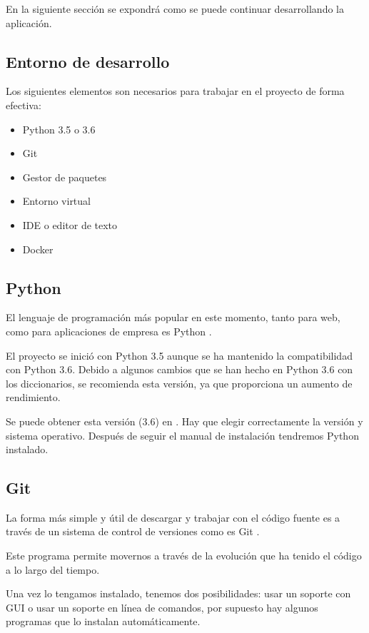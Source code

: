En la siguiente sección se expondrá como se puede continuar desarrollando la aplicación.

\subsection{Entorno de desarrollo}

Los siguientes elementos son necesarios para trabajar en el proyecto de forma efectiva:

\begin{itemize}
\setlength{\itemsep}{1pt}
\setlength{\parskip}{0pt}
\setlength{\parsep}{0pt}
\item Python 3.5 o 3.6
\item Git
\item Gestor de paquetes
\item Entorno virtual
\item IDE o editor de texto
\item Docker
\end{itemize}

\subsection{Python}

El lenguaje de programación más popular en este momento, tanto para web, como para aplicaciones de empresa es Python \cite{ppl}.

El proyecto se inició con Python 3.5 aunque se ha mantenido la compatibilidad con Python 3.6. Debido a algunos cambios que se han hecho en Python 3.6 con los diccionarios, se recomienda esta versión, ya que proporciona un aumento de rendimiento.

Se puede obtener esta versión (3.6) en \cite{py}. Hay que elegir correctamente la versión y sistema operativo. Después de seguir el manual de instalación tendremos Python instalado.

\subsection{Git}

La forma más simple y útil de descargar y trabajar con el código fuente es a través de un sistema de control de versiones como es Git \cite{git}.

Este programa permite movernos a través de la evolución que ha tenido el código a lo largo del tiempo.

Una vez lo tengamos instalado, tenemos dos posibilidades: usar un soporte con GUI o usar un soporte en línea de comandos, por supuesto hay algunos programas que lo instalan automáticamente.

